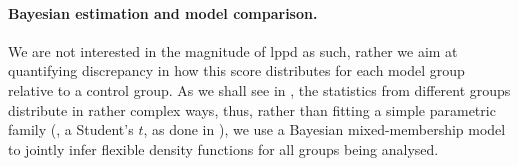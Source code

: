 

\paragraph{Bayesian estimation and model comparison.} We are not interested in the magnitude of lppd as such, rather we aim at quantifying discrepancy in how this score distributes for each model group relative to a control group. 
As we shall see in , the statistics from different groups distribute in rather complex ways, thus, rather than fitting a simple parametric family (\eg, a Student's $t$, as done in \citep{kruschke2013bayesian}), we use a Bayesian mixed-membership model \citep{blei2014build,airoldi2015handbook} to jointly infer flexible density functions for all groups being analysed. 

